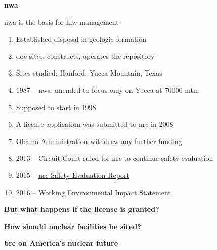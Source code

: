 \documentclass[aspectratio=1610,pdftex,dvipsnames,compress,xcolor={dvipsnames}]{beamer}
\newcommand{\acf}{\acrfull} %
\newcommand{\acl}{\acrlong} %
\newcommand{\acs}{\acrshort} %
\begin{document}
\begin{frame}[plain]{}
    \centering\LARGE\textbf{\acf{nwa}}
\end{frame}


\addtocounter{framenumber}{-1} 
\begin{frame}{\acl{nwa} is the basis for \acs{hlw} management}
    \begin{enumerate}[series=outerlist,topsep=0pt,itemsep=7pt,leftmargin=*,label=(\arabic*)]
        \item[]Established disposal in geologic formation
        \item[]\acs{doe} sites, constructs, operates the repository
        \item[]Sites studied: Hanford, Yucca Mountain, Texas
        \item[]1987 -- \acs{nwa} amended to focus only on Yucca at 70000 \acs{mtm}
        \item[]Supposed to start in 1998
        \item[]A license application was submitted to \acs{nrc} in 2008
        \item[]Obama Administration withdrew any further funding
        \item[]2013 -- Circuit Court ruled for \acs{nrc} to continue safety evaluation
        \item[]2015 -- \href{https://www.nrc.gov/reading-rm/doc-collections/nuregs/staff/sr1949/index.html}{\acs{nrc} Safety Evaluation Report}
        \item[]2016 -- \href{https://www.nrc.gov/waste/hlw-disposal/key-documents.html}{Working Environmental Impact Statement}
    \end{enumerate}
\end{frame}

\begin{frame}[plain]{}
    \centering\LARGE\textbf{But what happens if the license is granted?}
\end{frame}


\begin{frame}[plain]{}
    \centering\LARGE\textbf{How should nuclear facilities be sited?}
\end{frame}


\begin{frame}[plain]{}
    \centering\LARGE\textbf{\acl{brc} on America's nuclear future}
\end{frame}
\end{document}
